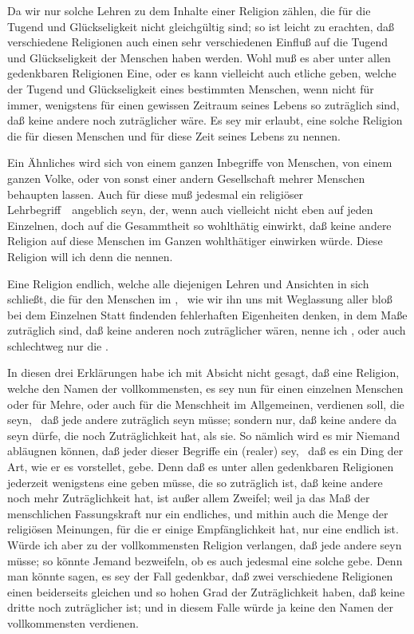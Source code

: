 \begin{aufza}
\item Da wir nur solche Lehren zu dem Inhalte einer Religion zählen, die für die Tugend und Glückseligkeit nicht gleichgültig sind; so ist leicht zu erachten, daß verschiedene Religionen auch einen sehr verschiedenen Einfluß auf die Tugend und Glückseligkeit der Menschen haben werden. Wohl muß es aber unter allen gedenkbaren Religionen Eine, oder es kann vielleicht auch etliche geben, welche der Tugend und Glückseligkeit eines bestimmten Menschen, wenn nicht für immer, wenigstens für einen gewissen Zeitraum seines Lebens so zuträglich sind, daß keine andere noch zuträglicher wäre. Es sey mir erlaubt, eine solche Religion die  für diesen Menschen und für diese Zeit seines Lebens zu nennen.
\item Ein Ähnliches wird sich von einem ganzen Inbegriffe von Menschen, von einem ganzen Volke, oder von sonst einer andern Gesellschaft mehrer Menschen behaupten lassen. Auch für diese muß jedesmal ein religiöser Lehrbegriff~\ angeblich seyn, der, wenn auch vielleicht nicht eben auf jeden Einzelnen, doch auf die Gesammtheit so wohlthätig einwirkt, daß keine andere Religion auf diese Menschen im Ganzen wohlthätiger einwirken würde. Diese Religion will ich denn die  nennen.
\item Eine Religion endlich, welche alle diejenigen Lehren und Ansichten in sich schließt, die für den Menschen im , \dh\ wie wir ihn uns mit Weglassung aller bloß bei dem Einzelnen Statt findenden fehlerhaften Eigenheiten denken, in dem Maße zuträglich sind, daß keine anderen noch zuträglicher wären, nenne ich , oder auch schlechtweg nur die .
\item In diesen drei Erklärungen habe ich mit Absicht nicht gesagt, daß eine Religion, welche den Namen der vollkommensten, es sey nun für einen einzelnen Menschen oder für Mehre, oder auch für die Menschheit im Allgemeinen, verdienen soll, die  seyn, \dh\ daß jede andere  zuträglich seyn müsse; sondern nur, daß keine andere da seyn dürfe, die noch  Zuträglichkeit hat, als sie. So nämlich wird es mir Niemand abläugnen können, daß jeder dieser Begriffe ein  (realer) sey, \dh\ daß es ein Ding der Art, wie er es vorstellet, gebe. Denn daß es unter allen gedenkbaren Religionen jederzeit wenigstens eine geben müsse, die so zuträglich ist, daß keine andere noch mehr Zuträglichkeit hat, ist außer allem Zweifel; weil ja das Maß der menschlichen Fassungskraft nur ein endliches, und mithin auch die Menge der religiösen Meinungen, für die er einige Empfänglichkeit hat, nur eine endlich ist. Würde ich aber zu der vollkommensten Religion verlangen, daß jede andere  seyn müsse; so könnte Jemand bezweifeln, ob es auch jedesmal eine solche gebe. Denn man könnte sagen, es sey der Fall gedenkbar, daß zwei verschiedene Religionen einen beiderseits gleichen und so hohen Grad der Zuträglichkeit haben, daß keine dritte noch zuträglicher ist; und in diesem Falle würde ja keine den Namen der vollkommensten verdienen.~

\end{aufza}
